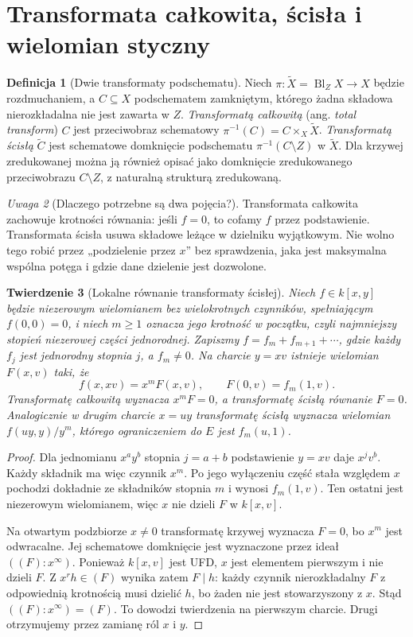 \documentclass[11pt,a4paper,openany]{report}
\numberwithin{equation}{section}
\theoremstyle{plain}
\newtheorem{twierdzenie}{Twierdzenie}[section]
\theoremstyle{definition}
\newtheorem{definicja}[twierdzenie]{Definicja}
\theoremstyle{remark}
\newtheorem{uwaga}[twierdzenie]{Uwaga}
\begin{document}
\section{Transformata całkowita, ścisła i wielomian styczny}
\label{sec:ga5-transform}

\begin{definicja}[Dwie transformaty podschematu]
\label{def:ga5-transform}
Niech $\pi:\widetilde X=\operatorname{Bl}_Z X\to X$
będzie rozdmuchaniem, a $C\subseteq X$ podschematem
zamkniętym, którego żadna składowa nierozkładalna
nie jest zawarta w $Z$. \emph{Transformatą całkowitą}
(ang. \emph{total transform}) $C$ jest przeciwobraz
schematowy $\pi^{-1}(C)=C\times_X\widetilde X$.
\emph{Transformatą ścisłą} $\widetilde C$ jest
schematowe domknięcie podschematu
$\pi^{-1}(C\setminus Z)$ w $\widetilde X$.
Dla krzywej zredukowanej można ją również opisać
jako domknięcie zredukowanego przeciwobrazu
$C\setminus Z$, z naturalną strukturą zredukowaną.
\end{definicja}

\begin{uwaga}[Dlaczego potrzebne są dwa pojęcia?]
Transformata całkowita zachowuje krotności równania:
jeśli $f=0$, to cofamy $f$ przez podstawienie.
Transformata ścisła usuwa składowe leżące w dzielniku
wyjątkowym. Nie wolno tego robić przez
„podzielenie przez $x$” bez sprawdzenia, jaka jest
maksymalna wspólna potęga i gdzie dane dzielenie
jest dozwolone.
\end{uwaga}

\begin{twierdzenie}[Lokalne równanie transformaty ścisłej]
\label{tw:ga5-strict-formula}
Niech $f\in k[x,y]$ będzie niezerowym wielomianem bez
wielokrotnych czynników, spełniającym $f(0,0)=0$,
i niech $m\ge1$ oznacza jego
krotność w początku, czyli najmniejszy stopień
niezerowej części jednorodnej. Zapiszmy
$f=f_m+f_{m+1}+\cdots$, gdzie każdy $f_j$
jest jednorodny stopnia $j$, a $f_m\ne0$.
Na charcie $y=xv$ istnieje wielomian $F(x,v)$ taki, że
\[
 f(x,xv)=x^mF(x,v),\qquad F(0,v)=f_m(1,v).
\]
Transformatę całkowitą wyznacza $x^mF=0$, a transformatę
ścisłą równanie $F=0$. Analogicznie w drugim charcie
$x=uy$ transformatę ścisłą wyznacza wielomian
$f(uy,y)/y^m$, którego ograniczeniem do $E$ jest
$f_m(u,1)$.
\end{twierdzenie}
\begin{proof}
Dla jednomianu $x^ay^b$ stopnia $j=a+b$ podstawienie
$y=xv$ daje $x^jv^b$. Każdy składnik ma więc czynnik
$x^m$. Po jego wyłączeniu część stała względem $x$
pochodzi dokładnie ze składników stopnia $m$ i wynosi
$f_m(1,v)$. Ten ostatni jest niezerowym wielomianem,
więc $x$ nie dzieli $F$ w $k[x,v]$.

Na otwartym podzbiorze $x\ne0$ transformatę krzywej
wyznacza $F=0$, bo $x^m$ jest odwracalne.
Jej schematowe domknięcie jest wyznaczone przez ideał
$((F):x^\infty)$. Ponieważ $k[x,v]$ jest UFD,
$x$ jest elementem pierwszym i nie dzieli $F$.
Z $x^r h\in(F)$ wynika zatem $F\mid h$:
każdy czynnik nierozkładalny $F$ z odpowiednią
krotnością musi dzielić $h$, bo żaden nie jest
stowarzyszony z $x$. Stąd $((F):x^\infty)=(F)$.
To dowodzi twierdzenia na pierwszym charcie.
Drugi otrzymujemy przez zamianę ról $x$ i $y$.
\end{proof}
\end{document}

